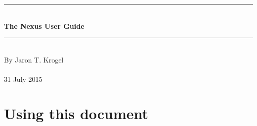 \documentclass[oneside,11pt]{memoir}
\numberwithin{equation}{section}
\newcommand{\HRule}{\rule{\linewidth}{0.5mm}}
\newenvironment{changemargin}[2]{%
\begin{list}{}{%
\setlength{\leftmargin}{#1}%
\setlength{\rightmargin}{#2}%
}%
\item[]}{\end{list}}
\begin{document}


\thispagestyle{empty}
\begin{changemargin}{-1cm}{-1cm}
  \begin{center}
    \hspace{1cm}\\
    \hspace{1cm}\\
    \hspace{1cm}\\
    \hspace{1cm}\\
    \hspace{1cm}\\
    \hspace{1cm}\\
    \hspace{1cm}\\
    \hspace{1cm}\\
    \hspace{1cm}\\
    \hspace{1cm}\\
    \hspace{1cm}\\
    \hspace{1cm}\\
    \HRule\\
    \vspace{4mm}
    \textbf{\fontsize{40}{45}\selectfont The Nexus User Guide} \\ 
    \HRule\\
    \vspace{1cm}
    \vspace{6cm}
    By Jaron T. Krogel \\
    \hspace{1cm}\\
    31 July 2015
  \end{center}
\end{changemargin}
\pagebreak

\tableofcontents



\mainmatter

\pagebreak
\chapter{Using this document} \label{usedoc}
\end{document}
